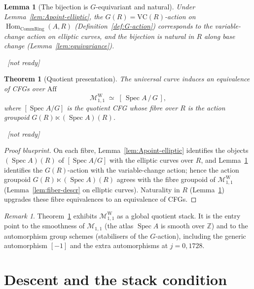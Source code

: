 \documentclass[11pt]{article}
\newcommand{\lean}[1]{\par\smallskip\noindent{\footnotesize\texttt{Lean:\ #1}}\par}
\newcommand{\uses}[1]{}
\newcommand{\notready}{{\footnotesize\textcolor{red!60!black}{\ [not ready]}}}
\theoremstyle{definition}
\theoremstyle{plain}
\newtheorem{lemma}[definition]{Lemma}
\newtheorem{theorem}[definition]{Theorem}
\theoremstyle{remark}
\newtheorem{remark}[definition]{Remark}
\newcommand{\Aff}{\mathrm{Aff}}
\newcommand{\CRing}{\mathrm{CommRing}}
\newcommand{\Spec}{\operatorname{Spec}}
\newcommand{\MW}{\mathcal{M}^{\mathrm{W}}_{1,1}}
\newcommand{\Mss}{\mathcal{M}_{1,1}}
\newcommand{\VC}{\mathrm{VC}}
\newcommand{\Hom}{\operatorname{Hom}}
\begin{document}
\begin{lemma}[The bijection is $G$-equivariant and natural]\label{lem:quotient-compat}
Under Lemma~\ref{lem:Apoint-elliptic}, the $G(R)=\VC(R)$-action on
$\Hom_{\CRing}(A,R)$ (Definition~\ref{def:G-action}) corresponds to the
variable-change action on elliptic curves, and the bijection is natural in $R$
along base change (Lemma~\ref{lem:equivariance}).
\lean{}\notready
\uses{lem:Apoint-elliptic,def:G-action,lem:equivariance}
\end{lemma}

\begin{theorem}[Quotient presentation]\label{thm:quotient}
The universal curve induces an equivalence of CFGs over $\Aff$
\[
   \MW \;\simeq\; [\,\Spec A\,/\,G\,],
\]
where $[\Spec A/G]$ is the quotient CFG whose fibre over $R$ is the action
groupoid $G(R)\ltimes(\Spec A)(R)$.
\lean{}\notready
\uses{thm:MW-cfg,lem:univ-elliptic,lem:G-representable,lem:Apoint-elliptic,lem:quotient-compat,lem:fiber-descr}
\end{theorem}
\begin{proof}[Proof blueprint]
On each fibre, Lemma~\ref{lem:Apoint-elliptic} identifies the objects
$(\Spec A)(R)$ of $[\Spec A/G]$ with the elliptic curves over $R$, and
Lemma~\ref{lem:quotient-compat} identifies the $G(R)$-action with the
variable-change action; hence the action groupoid $G(R)\ltimes(\Spec A)(R)$ agrees
with the fibre groupoid of $\MW$ (Lemma~\ref{lem:fiber-descr} on elliptic curves).
Naturality in $R$ (Lemma~\ref{lem:quotient-compat}) upgrades these fibre
equivalences to an equivalence of CFGs.
\end{proof}

\begin{remark}
Theorem~\ref{thm:quotient} exhibits $\MW$ as a global quotient stack.  It is the
entry point to the smoothness of $\Mss$ (the atlas $\Spec A$ is smooth over
$\mathbb Z$) and to the automorphism group schemes (stabilisers of the
$G$-action), including the generic automorphism $[-1]$ and the extra automorphisms
at $j=0,1728$.
\end{remark}

\section{Descent and the stack condition}\label{sec:descent}
\end{document}
